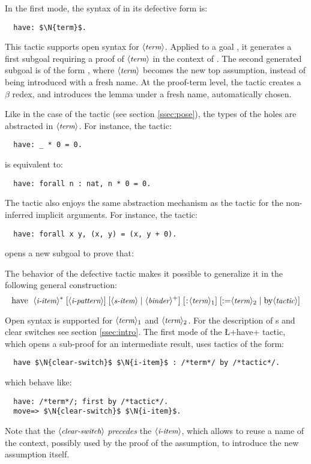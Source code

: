 In the first mode, the syntax of  in its defective form is:
\begin{lstlisting}
  have: $\N{term}$.
\end{lstlisting}
This tactic supports open syntax for $\langle\mbox{\itshape\rmfamily\small term}\rangle$.
Applied to a goal , it generates a first subgoal requiring a
proof of $\langle\mbox{\itshape\rmfamily\small term}\rangle$ in the context of . The  second generated
subgoal is of the form , where $\langle\mbox{\itshape\rmfamily\small term}\rangle$ becomes
the new top assumption, instead of being introduced with a fresh
name. At the proof-term level, the  tactic creates a $\beta$
redex, and introduces the lemma under a fresh name, automatically
chosen.


Like in the case of the  tactic (see section \ref{ssec:pose}),
the types of the holes are abstracted in $\langle\mbox{\itshape\rmfamily\small term}\rangle$.
For instance, the tactic:
\begin{lstlisting}
  have: _ * 0 = 0.
\end{lstlisting}
is equivalent to:
\begin{lstlisting}
  have: forall n : nat, n * 0 = 0.
\end{lstlisting}
The  tactic also enjoys the same abstraction mechanism as the
 tactic for the non-inferred implicit arguments. For instance,
the tactic:
\begin{lstlisting}
  have: forall x y, (x, y) = (x, y + 0).
\end{lstlisting}
opens a new subgoal to prove that:

\noindent{}


The behavior of the defective  tactic makes it possible to
generalize it in the
following general construction:
  $$\C{have }\ \;\N{i-item}^* \; [\N{i-pattern}] \;
     [\N{s-item}\;|\;\N{binder}^+]\;[\C{:} \N{term}_1]\;
     [\C{:=} \N{term}_2 \;|\; \C{by }\N{tactic}]$$

Open syntax is supported for $\langle\mbox{\itshape\rmfamily\small term}\rangle_1$ and $\langle\mbox{\itshape\rmfamily\small term}\rangle_2$. For the
description of
\iitem{}s and clear switches see section \ref{ssec:intro}.
The first mode of the \L+have+ tactic, which opens a sub-proof for an
intermediate result, uses tactics of the form:
\begin{lstlisting}
  have $\N{clear-switch}$ $\N{i-item}$ : /*term*/ by /*tactic*/.
\end{lstlisting}
which behave like:
\begin{lstlisting}
  have: /*term*/; first by /*tactic*/.
  move=> $\N{clear-switch}$ $\N{i-item}$.
\end{lstlisting}
Note that the $\langle\mbox{\itshape\rmfamily\small clear-switch}\rangle$ \emph{precedes} the
$\langle\mbox{\itshape\rmfamily\small i-item}\rangle$, which allows to reuse a name of the context, possibly used
by the proof of the assumption, to introduce the new assumption
itself.


